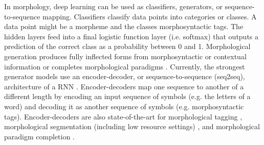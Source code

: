 \documentclass[12pt]{article}
\begin{document}
In morphology, deep learning can be used as classifiers, generators, or sequence-to-sequence mapping. Classifiers classify data points into categories or classes. A data point might be a morpheme and the classes morphosyntactic tags. 
The hidden layers feed into a final logistic function layer (i.e. softmax) that outputs a prediction of the correct class as a probability between 0 and 1. Morphological generation produces fully inflected forms from morphosyntactic or contextual information \cite{cotterell_conll-sigmorphon_2017} or completes morphological paradigms \cite{malouf_generating_2016}. Currently, the strongest generator models use an encoder-decoder, or sequence-to-sequence (seq2seq), architecture of a RNN \cite{sutskever2014,kann_neural_2016}. Encoder-decoders map one sequence to another of a different length by encoding an input sequence of symbols (e.g. the letters of a word) and decoding it as another sequence of symbols (e.g. morphosyntactic tags). Encoder-decoders are also state-of-the-art for morphological tagging \cite{heigold_extensive_2017}, morphological segmentation (including low resource settings) \cite{kann_fortification_2018}, and morphological paradigm completion \cite{cotterell_conllsigmorphon_2018}. 
\end{document}

